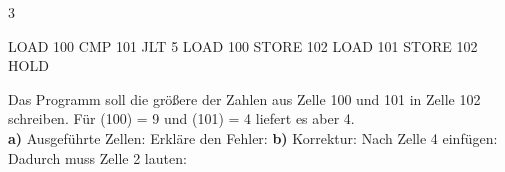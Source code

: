 \documentclass[11pt,a4paper]{article}
\begin{document}
\begin{aufgabe}{3}
\begin{minipage}[t]{0.27\linewidth}
\vspace{0pt}
\begin{asm}[aboveskip=0mm]
LOAD 100
CMP 101
JLT 5
LOAD 100
STORE 102
LOAD 101
STORE 102
HOLD
\end{asm}
\end{minipage}\hfill
\begin{minipage}[t]{0.69\linewidth}
\vspace{0pt}\lueckentext
Das Programm soll die größere der Zahlen aus Zelle 100 und 101 in Zelle 102 schreiben. Für (100) = 9 und (101) = 4 liefert es aber 4.\\
\textbf{a)} Ausgeführte Zellen: 
Erkläre den Fehler:
\textbf{b)} Korrektur: Nach Zelle 4 einfügen:  Dadurch muss Zelle 2 lauten: 
\end{minipage}
\end{aufgabe}
\end{document}
